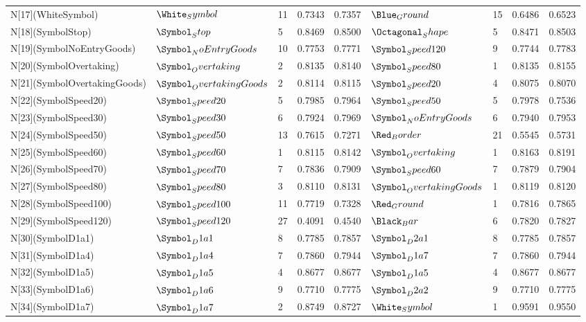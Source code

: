 \begin{tabular}{lllllllll}
N[17](WhiteSymbol) & $\White_Symbol$ & 11 & 0.7343 & 0.7357 & $\Blue_Ground$ & 15 & 0.6486 & 0.6523 \\
N[18](SymbolStop) & $\Symbol_Stop$ & 5 & 0.8469 & 0.8500 & $\Octagonal_Shape$ & 5 & 0.8471 & 0.8503 \\
N[19](SymbolNoEntryGoods) & $\Symbol_NoEntryGoods$ & 10 & 0.7753 & 0.7771 & $\Symbol_Speed120$ & 9 & 0.7744 & 0.7783 \\
N[20](SymbolOvertaking) & $\Symbol_Overtaking$ & 2 & 0.8135 & 0.8140 & $\Symbol_Speed80$ & 1 & 0.8135 & 0.8155 \\
N[21](SymbolOvertakingGoods) & $\Symbol_OvertakingGoods$ & 2 & 0.8114 & 0.8115 & $\Symbol_Speed20$ & 4 & 0.8075 & 0.8070 \\
N[22](SymbolSpeed20) & $\Symbol_Speed20$ & 5 & 0.7985 & 0.7964 & $\Symbol_Speed50$ & 5 & 0.7978 & 0.7536 \\
N[23](SymbolSpeed30) & $\Symbol_Speed30$ & 6 & 0.7924 & 0.7969 & $\Symbol_NoEntryGoods$ & 6 & 0.7940 & 0.7953 \\
N[24](SymbolSpeed50) & $\Symbol_Speed50$ & 13 & 0.7615 & 0.7271 & $\Red_Border$ & 21 & 0.5545 & 0.5731 \\
N[25](SymbolSpeed60) & $\Symbol_Speed60$ & 1 & 0.8115 & 0.8142 & $\Symbol_Overtaking$ & 1 & 0.8163 & 0.8191 \\
N[26](SymbolSpeed70) & $\Symbol_Speed70$ & 7 & 0.7836 & 0.7909 & $\Symbol_Speed60$ & 7 & 0.7879 & 0.7904 \\
N[27](SymbolSpeed80) & $\Symbol_Speed80$ & 3 & 0.8110 & 0.8131 & $\Symbol_OvertakingGoods$ & 1 & 0.8119 & 0.8120 \\
N[28](SymbolSpeed100) & $\Symbol_Speed100$ & 11 & 0.7719 & 0.7328 & $\Red_Ground$ & 1 & 0.7816 & 0.7865 \\
N[29](SymbolSpeed120) & $\Symbol_Speed120$ & 27 & 0.4091 & 0.4540 & $\Black_Bar$ & 6 & 0.7820 & 0.7827 \\
N[30](SymbolD1a1) & $\Symbol_D1a1$ & 8 & 0.7785 & 0.7857 & $\Symbol_D2a1$ & 8 & 0.7785 & 0.7857 \\
N[31](SymbolD1a4) & $\Symbol_D1a4$ & 7 & 0.7860 & 0.7944 & $\Symbol_D1a7$ & 7 & 0.7860 & 0.7944 \\
N[32](SymbolD1a5) & $\Symbol_D1a5$ & 4 & 0.8677 & 0.8677 & $\Symbol_D1a5$ & 4 & 0.8677 & 0.8677 \\
N[33](SymbolD1a6) & $\Symbol_D1a6$ & 9 & 0.7710 & 0.7775 & $\Symbol_D2a2$ & 9 & 0.7710 & 0.7775 \\
N[34](SymbolD1a7) & $\Symbol_D1a7$ & 2 & 0.8749 & 0.8727 & $\White_Symbol$ & 1 & 0.9591 & 0.9550 \\

\end{tabular}
